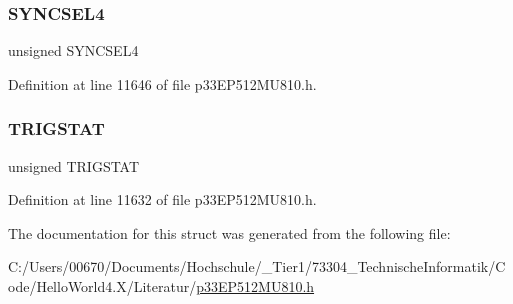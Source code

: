 \subsubsection{\texorpdfstring{S\+Y\+N\+C\+S\+E\+L4}{SYNCSEL4}}
{\footnotesize\ttfamily unsigned S\+Y\+N\+C\+S\+E\+L4}



Definition at line 11646 of file p33\+E\+P512\+M\+U810.\+h.

\mbox{\label{structtag_o_c8_c_o_n2_b_i_t_s_ab379549de54ac93ad4aa73686c34cb7c}} 
\subsubsection{\texorpdfstring{T\+R\+I\+G\+S\+T\+AT}{TRIGSTAT}}
{\footnotesize\ttfamily unsigned T\+R\+I\+G\+S\+T\+AT}



Definition at line 11632 of file p33\+E\+P512\+M\+U810.\+h.



The documentation for this struct was generated from the following file\+:\begin{DoxyCompactItemize}
\item 
C\+:/\+Users/00670/\+Documents/\+Hochschule/\+\_\+\+Tier1/73304\+\_\+\+Technische\+Informatik/\+Code/\+Hello\+World4.\+X/\+Literatur/\hyperlink{p33_e_p512_m_u810_8h}{p33\+E\+P512\+M\+U810.\+h}\end{DoxyCompactItemize}
